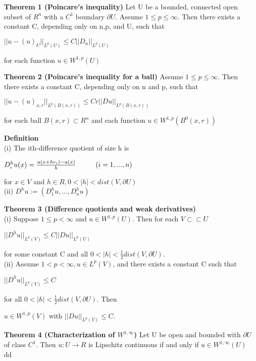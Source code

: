 \documentclass{article}
\newcommand\tab[1][1cm]{\hspace*{#1}}
\begin{document}
\textbf {Theorem 1 (Poincare's inequality)} Let U be a bounded, connected open subset of $R^n$ with a $C^1$ boundary $\partial U$. Assume $1 \leq p \leq \infty$. Then there exists a constant C, depending only on n,p, and U, such that
 \begin{center}
$||u-(u)_U||_{L^{p}(U)} \leq C||D_u||_{L^{p}(U)}$
\end{center}
for each function $u \in W^{1,p} (U)$

\textbf {Theorem 2 (Poincare's inequality for a ball)} Assume $1 \leq p \leq \infty$. Then there exists a constant C, depending only on n and p, such that
 \begin{center}
$||u-(u)_{x,r}||_{L^{p}(B(x,r))} \leq Cr ||Du||_{L^{p}(B(x,r))}$
\end{center}
for each ball $B(x,r) \subset R^n$ and each function $u \in W^{1,p}(B^0(x,r))$

\textbf {Definition} \\
\tab (i) The ith-difference quotient of size h is
 \begin{center}
$D_i^h u(x) = \frac{u(x+he_i)-u(x)}{h} \tab (i = 1,...,n)$
\end{center}
for $x \in V$ and $h \in R, 0 < |h| < dist(V, \partial U)$ \\
\tab (ii) $D^h u := (D_1^h u ,..., D_n^h u)$

\textbf {Theorem 3 (Difference quotients and weak derivatives)} \\
\tab (i) Suppose $1 \leq p < \infty$ and $u \in W^{1,p}(U)$. Then for each $V \subset \subset U$ 
 \begin{center}
$||D^h u ||_{L^{p}(V)} \leq C||Du||_{L^{p}(U)}$
\end{center}
for some constant C and all $0 < |h| < \frac{1}{2} dist (V, \partial U)$. \\
\tab (ii) Assume $1 < p < \infty, u \in L^p(V)$, and there exists a constant C such that 
 \begin{center}
$||D^h u||_{L^{p}(V)} \leq C$
\end{center}
for all $0 < |h| < \frac{1}{2} dist (V, \partial U)$. Then
 \begin{center}
$u \in W^{1,p}(V)$ \tab with $||Du||_{L^{p}(V)} \leq C$.
\end{center}

\textbf {Theorem 4 (Characterization of $W^{1,\infty}$)} Let U be open and bounded with $\partial U$ of class $C^1$. Then $u : U \to R$ is Lipschitz continuous if and only if $u \in W^{1, \infty}(U)$dd
\end{document}
